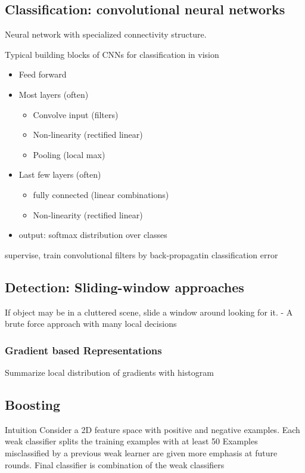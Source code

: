\subsection{Classification: convolutional neural networks}
Neural network with specialized connectivity structure.

Typical building blocks of CNNs for classification in vision

\begin{itemize}
	\item Feed forward
	\item Most layers (often)
	\begin{itemize}
		\item Convolve input (filters)
		\item Non-linearity (rectified linear)
		\item Pooling (local max)
	\end{itemize}
	\item Last few layers (often)
	\begin{itemize}
		\item fully connected (linear combinations)
		\item Non-linearity (rectified linear)
	\end{itemize} 
	\item output: softmax distribution over classes
\end{itemize}
supervise, train convolutional filters by back-propagatin classification error


\subsection{Detection: Sliding-window approaches}
If object may be in a cluttered scene, slide a window around looking for it. - A brute force approach with many local decisions

\subsubsection{Gradient based Representations}
Summarize local distribution of gradients with histogram

\subsection{Boosting}
Intuition
Consider a 2D feature
space with positive and negative examples.
Each weak classifier splits the training examples with at least 50%
Examples misclassified by a previous weak learner are given more emphasis at future rounds. Final classifier is combination of the weak classifiers

